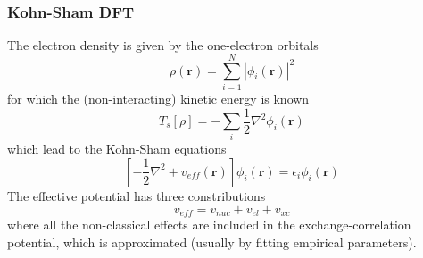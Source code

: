 \documentclass[mathserif]{beamer}
\begin{document}
\begin{frame}
    \frametitle{Kohn-Sham DFT}
    The electron density is given by the one-electron orbitals
    \begin{equation}
	\rho(\boldsymbol{r}) = \sum_{i=1}^N |\phi_i(\boldsymbol{r})|^2
    \end{equation}
    for which the (non-interacting) kinetic energy is known
    \begin{equation}
	T_s[\rho] = -\sum_i \frac{1}{2}\nabla^2\phi_i(\boldsymbol{r})
    \end{equation}
    which lead to the Kohn-Sham equations
    \begin{equation}
	\left[-\frac{1}{2}\nabla^2 + v_{eff}(\boldsymbol{r})\right]\phi_i(\boldsymbol{r}) = 
	\epsilon_i\phi_i(\boldsymbol{r})
    \end{equation}
    The effective potential has three constributions
    \begin{equation}
	v_{eff} = v_{nuc} + v_{el} + v_{xc}
    \end{equation}
    where all the non-classical effects are included in the exchange-correlation potential,
    which is approximated (usually by fitting empirical parameters).
\end{frame}
\end{document}
